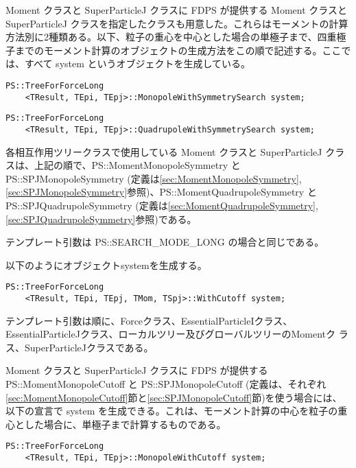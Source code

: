 Moment クラスと SuperParticleJ クラスに FDPS が提供する Moment クラスと SuperParticleJ クラスを指定したクラスも用意した。これらはモーメントの計算方法別に2種類ある。以下、粒子の重心を中心とした場合の単極子まで、四重極子までのモーメント計算のオブジェクトの生成方法をこの順で記述する。ここでは、すべて system というオブジェクトを生成している。

\begin{screen}
\begin{verbatim}
PS::TreeForForceLong
    <TResult, TEpi, TEpj>::MonopoleWithSymmetrySearch system;
\end{verbatim}
\end{screen}


\begin{screen}
\begin{verbatim}
PS::TreeForForceLong
    <TResult, TEpi, TEpj>::QuadrupoleWithSymmetrySearch system;
\end{verbatim}
\end{screen}

各相互作用ツリークラスで使用している Moment クラスと SuperParticleJ クラスは、上記の順で、PS::MomentMonopoleSymmetry と PS::SPJMonopoleSymmetry
(定義は\ref{sec:MomentMonopoleSymmetry}, \ref{sec:SPJMonopoleSymmetry}参照)、PS::MomentQuadrupoleSymmetry と PS::SPJQuadrupoleSymmetry
(定義は\ref{sec:MomentQuadrupoleSymmetry}, \ref{sec:SPJQuadrupoleSymmetry}参照)である。

テンプレート引数は PS::SEARCH\_MODE\_LONG の場合と同じである。


以下のようにオブジェクトsystemを生成する。
\begin{screen}
\begin{verbatim}
PS::TreeForForceLong
    <TResult, TEpi, TEpj, TMom, TSpj>::WithCutoff system;
\end{verbatim}
\end{screen}
テンプレート引数は順に、Forceクラス、EssentialParticleIクラス、
EssentialParticleJクラス、ローカルツリー及びグローバルツリーのMomentク
ラス、SuperParticleJクラスである。

Moment クラスと SuperParticleJ クラスに FDPS が提供する PS::MomentMonopoleCutoff と PS::SPJMonopoleCutoff (定義は、それぞれ
 \ref{sec:MomentMonopoleCutoff}節と\ref{sec:SPJMonopoleCutoff}節)を使う場合には、以下の宣言で system を生成できる。これは、モーメント計算の中心を粒子の重心とした場合に、単極子まで計算するものである。
\begin{screen}
\begin{verbatim}
PS::TreeForForceLong
    <TResult, TEpi, TEpj>::MonopoleWithCutoff system;
\end{verbatim}
\end{screen}

